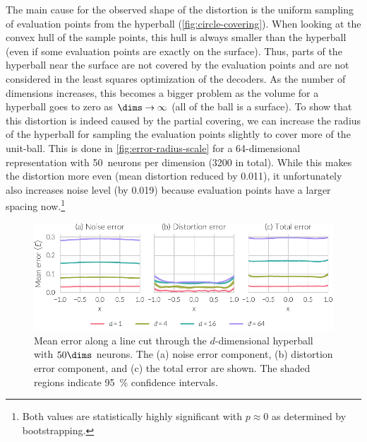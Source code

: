 The main cause for the observed shape of the distortion is the uniform sampling of evaluation points from the hyperball (\cref{fig:circle-covering}).
When looking at the convex hull of the sample points, this hull is always smaller than the hyperball (even if some evaluation points are exactly on the surface).
Thus, parts of the hyperball near the surface are not covered by the evaluation points and are not considered in the least squares optimization of the decoders.
As the number of dimensions increases, this becomes a bigger problem as the volume for a hyperball goes to zero as $\dims \rightarrow \infty$ (all of the ball is a surface).
To show that this distortion is indeed caused by the partial covering, we can increase the radius of the hyperball for sampling the evaluation points slightly to cover more of the unit-ball.
This is done in \cref{fig:error-radius-scale} for a 64-dimensional representation with \num{50}~neurons per dimension (\num{3200} in total).
While this makes the distortion more even (mean distortion reduced by \num{0.011}), it unfortunately also increases noise level (by \num{0.019}) because evaluation points have a larger spacing now.\footnote{Both values are statistically highly significant with $p \approx 0$ as determined by bootstrapping.}
\begin{figure}
    \centering
    \includegraphics{figures/error-linecut}
    \caption[Mean error along line cut through hyperball]{Mean error along a line cut through the $d$-dimensional hyperball with $50\dims$ neurons. The (a) noise error component, (b) distortion error component, and (c) the total error are shown. The shaded regions indicate \SI{95}{\percent} confidence intervals.}\label{fig:error-linecut}
\end{figure}
